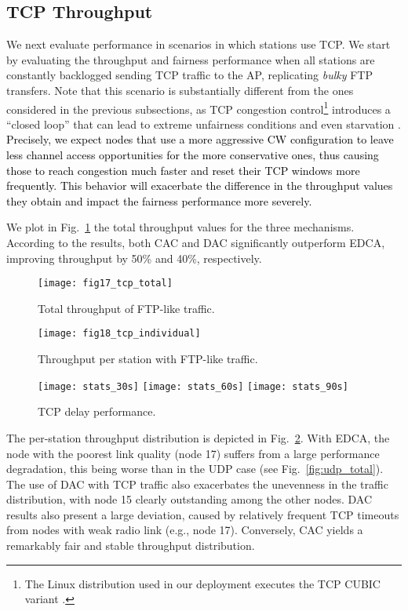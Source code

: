 \documentclass[a4paper,10pt]{article}
\newcommand{\revs}[1]{\textcolor{black}{#1}}
\begin{document}
\vspace{0.5em}
\subsection{TCP Throughput}

We next evaluate performance in scenarios in which stations use TCP. We start by evaluating the throughput and fairness performance when all stations are constantly backlogged sending TCP traffic to the AP, replicating \emph{bulky} FTP transfers. Note that this scenario is substantially different from the ones considered in the previous subsections, as TCP congestion control\footnote{The Linux distribution used in our deployment executes the TCP CUBIC variant \cite{ha08}.} introduces a ``closed loop'' that can lead to extreme unfairness conditions and even starvation \cite{gurewitz}. \revs{Precisely, we expect nodes that use a more aggressive CW configuration to leave less channel access opportunities for the more conservative ones, thus causing those to reach congestion much faster and reset their TCP windows more frequently. This behavior will exacerbate the difference in the throughput values they obtain and impact the fairness performance more severely.}

We plot in Fig.~\ref{fig:tcp_total} the total throughput values for the three mechanisms. According to the results, both CAC and DAC significantly outperform EDCA, improving throughput by 50\% and 40\%, respectively.

\begin{figure}[!t]\texttt{[image: fig17\_tcp\_total]}\caption{Total throughput of FTP-like traffic. }\label{fig:tcp_total}\end{figure}

\begin{figure}[t]\texttt{[image: fig18\_tcp\_individual]}\caption{Throughput per station with FTP-like traffic.}\label{fig:tcp_individual}\end{figure}

\begin{figure}[p]
\centering
\texttt{[image: stats\_30s]}
\texttt{[image: stats\_60s]}
\texttt{[image: stats\_90s]}
\caption{TCP delay performance.}\label{fig:delay_individual}\end{figure}

The per-station throughput distribution is depicted in Fig.~\ref{fig:tcp_individual}. With EDCA, the node with the poorest link quality (node 17) suffers from a large performance degradation, this being worse than in the UDP case (see Fig.~\ref{fig:udp_total}). The use of DAC with TCP traffic also exacerbates the unevenness in the traffic distribution, with node 15 clearly outstanding among the other nodes. DAC results also present a large deviation, caused by relatively frequent TCP timeouts from nodes with weak radio link (e.g., node 17). Conversely, CAC yields a remarkably fair and stable throughput distribution. 
\end{document}
